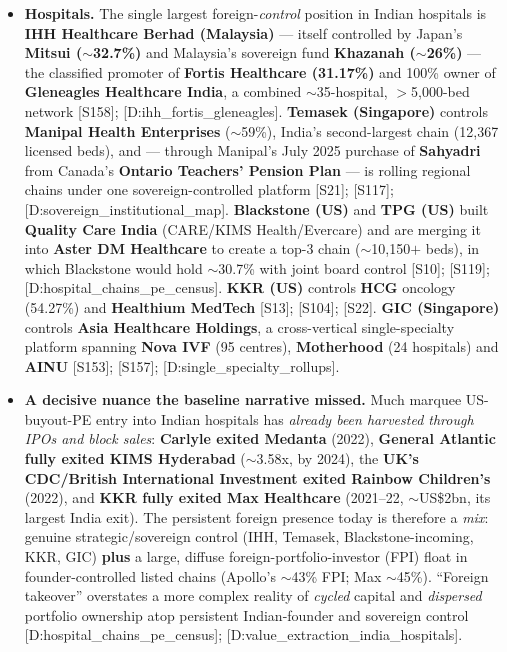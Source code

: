 \documentclass[11pt,a4paper]{article}
\newcommand{\cs}[1]{\textnormal{[#1]}}
\begin{document}
\begin{itemize}[leftmargin=1.4em,itemsep=4pt]
\item \textbf{Hospitals.} The single largest foreign-\emph{control} position in Indian hospitals is \textbf{IHH Healthcare Berhad (Malaysia)} --- itself controlled by Japan's \textbf{Mitsui ($\sim$32.7\%)} and Malaysia's sovereign fund \textbf{Khazanah ($\sim$26\%)} --- the classified promoter of \textbf{Fortis Healthcare (31.17\%)} and 100\% owner of \textbf{Gleneagles Healthcare India}, a combined $\sim$35-hospital, $>$5{,}000-bed network \cs{S158}; \cs{D:ihh\_fortis\_gleneagles}. \textbf{Temasek (Singapore)} controls \textbf{Manipal Health Enterprises} ($\sim$59\%), India's second-largest chain (12{,}367 licensed beds), and --- through Manipal's July 2025 purchase of \textbf{Sahyadri} from Canada's \textbf{Ontario Teachers' Pension Plan} --- is rolling regional chains under one sovereign-controlled platform \cs{S21}; \cs{S117}; \cs{D:sovereign\_institutional\_map}. \textbf{Blackstone (US)} and \textbf{TPG (US)} built \textbf{Quality Care India} (CARE/KIMS Health/Evercare) and are merging it into \textbf{Aster DM Healthcare} to create a top-3 chain ($\sim$10{,}150$+$ beds), in which Blackstone would hold $\sim$30.7\% with joint board control \cs{S10}; \cs{S119}; \cs{D:hospital\_chains\_pe\_census}. \textbf{KKR (US)} controls \textbf{HCG} oncology (54.27\%) and \textbf{Healthium MedTech} \cs{S13}; \cs{S104}; \cs{S22}. \textbf{GIC (Singapore)} controls \textbf{Asia Healthcare Holdings}, a cross-vertical single-specialty platform spanning \textbf{Nova IVF} (95 centres), \textbf{Motherhood} (24 hospitals) and \textbf{AINU} \cs{S153}; \cs{S157}; \cs{D:single\_specialty\_rollups}.

\item \textbf{A decisive nuance the baseline narrative missed.} Much marquee US-buyout-PE entry into Indian hospitals has \emph{already been harvested through IPOs and block sales}: \textbf{Carlyle exited Medanta} (2022), \textbf{General Atlantic fully exited KIMS Hyderabad} ($\sim$3.58x, by 2024), the \textbf{UK's CDC/British International Investment exited Rainbow Children's} (2022), and \textbf{KKR fully exited Max Healthcare} (2021--22, $\sim$US\$2bn, its largest India exit). The persistent foreign presence today is therefore a \emph{mix}: genuine strategic/sovereign control (IHH, Temasek, Blackstone-incoming, KKR, GIC) \textbf{plus} a large, diffuse foreign-portfolio-investor (FPI) float in founder-controlled listed chains (Apollo's $\sim$43\% FPI; Max $\sim$45\%). ``Foreign takeover'' overstates a more complex reality of \emph{cycled} capital and \emph{dispersed} portfolio ownership atop persistent Indian-founder and sovereign control \cs{D:hospital\_chains\_pe\_census}; \cs{D:value\_extraction\_india\_hospitals}.


\end{itemize}
\end{document}
